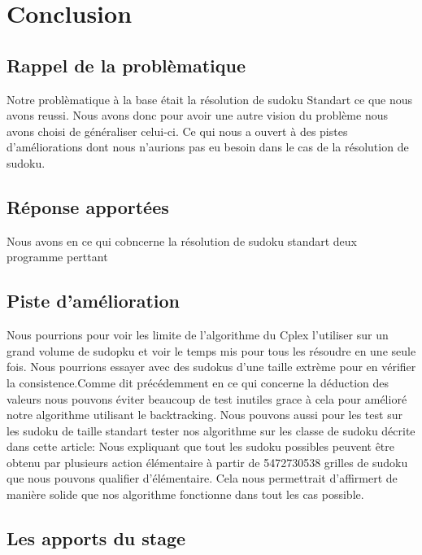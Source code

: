 \hypertarget{conclusion}{%
\chapter{Conclusion}\label{conclusion}}

\section{Rappel de la problèmatique}

Notre problèmatique à la base était la résolution de sudoku Standart ce que nous avons reussi. Nous avons donc pour avoir une autre vision du problème nous avons choisi de généraliser celui-ci. Ce qui nous a ouvert à des pistes d'améliorations dont nous n'aurions pas eu besoin dans le cas de la résolution de sudoku.

\section{Réponse apportées}
Nous avons en ce qui cobncerne la résolution de sudoku standart deux programme perttant
\section{Piste d'amélioration}
Nous pourrions pour voir les limite de l'algorithme du Cplex l'utiliser sur un grand volume de sudopku et voir le temps mis pour tous les résoudre en une seule fois. Nous pourrions essayer avec des sudokus d'une taille extrème pour en vérifier la consistence.\newline Comme dit précédemment en ce qui concerne la déduction des valeurs nous pouvons éviter beaucoup de test inutiles grace à cela pour amélioré notre algorithme utilisant le backtracking.\newline
Nous pouvons aussi pour les test sur les sudoku de taille standart tester nos algorithme sur les classe de sudoku décrite dans cette article:\newline
\cite{Differents}
\newline
Nous expliquant que tout les sudoku possibles peuvent être obtenu par plusieurs action élémentaire à partir de 5472730538 grilles de sudoku que nous pouvons qualifier d'élémentaire.
Cela nous permettrait d'affirmert de manière solide que nos algorithme fonctionne dans tout les cas possible.

\section{Les apports du stage}

